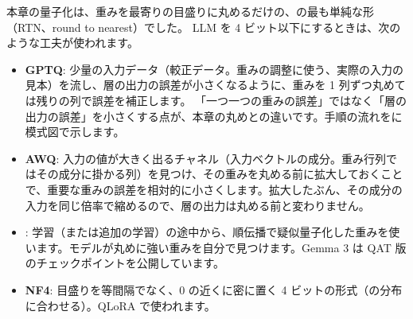 本章の量子化は、重みを最寄りの目盛りに丸めるだけの、の最も単純な形（RTN、round to nearest）でした。
LLM を 4 ビット以下にするときは、次のような工夫が使われます。

\begin{itemize}
\item \textbf{GPTQ}\cite{frantar2023gptq}: 少量の入力データ（較正データ。重みの調整に使う、実際の入力の見本）を流し、層の出力の誤差が小さくなるように、重みを 1 列ずつ丸めては残りの列で誤差を補正します。
「一つ一つの重みの誤差」ではなく「層の出力の誤差」を小さくする点が、本章の丸めとの違いです。手順の流れをに模式図で示します。
\item \textbf{AWQ}\cite{lin2024awq}: 入力の値が大きく出るチャネル（入力ベクトルの成分。重み行列ではその成分に掛かる列）を見つけ、その重みを丸める前に拡大しておくことで、重要な重みの誤差を相対的に小さくします。拡大したぶん、その成分の入力を同じ倍率で縮めるので、層の出力は丸める前と変わりません。
\item {}: 学習（または追加の学習）の途中から、順伝播で疑似量子化した重みを使います。モデルが丸めに強い重みを自分で見つけます\cite{jacob2018quantization}。Gemma 3 は QAT 版のチェックポイントを公開しています\cite{gemma2025gemma3}。
\item \textbf{NF4}\cite{dettmers2023qlora}: 目盛りを等間隔でなく、0 の近くに密に置く 4 ビットの形式（の分布に合わせる）。QLoRA で使われます。
\end{itemize}

